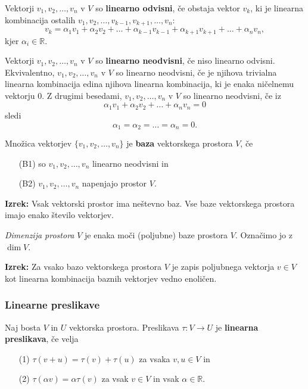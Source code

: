 \documentclass{article}
\begin{document}
\begin{multicols}{2}
Vektorji \( v_1, v_2, \ldots, v_n \) v \( V \) so \textbf{linearno odvisni}, če obstaja vektor \( v_k \), ki je linearna kombinacija ostalih \( v_1, v_2, \ldots, v_{k-1}, v_{k+1}, \ldots, v_n \):
\[ v_k = \alpha_1v_1 + \alpha_2v_2 + \ldots + \alpha_{k-1}v_{k-1} + \alpha_{k+1}v_{k+1} + \ldots + \alpha_nv_n, \]
kjer \( \alpha_i \in \mathbb{R} \).

Vektorji \( v_1, v_2, \ldots, v_n \) v \( V \) so \textbf{linearno neodvisni}, če niso linearno odvisni. Ekvivalentno, \( v_1, v_2, \ldots, v_n \) v \( V \) so linearno neodvisni, če je njihova trivialna linearna kombinacija edina njihova linearna kombinacija, ki je enaka ničelnemu vektorju \( 0 \). Z drugimi besedami, \( v_1, v_2, \ldots, v_n \) v \( V \) so linearno neodvisni, če iz
\[ \alpha_1v_1 + \alpha_2v_2 + \ldots + \alpha_nv_n = 0 \]
sledi
\[ \alpha_1 = \alpha_2 = \ldots = \alpha_n = 0. \]


Množica vektorjev \( \{v_1, v_2, \ldots, v_n\} \) je \textbf{baza} vektorskega prostora \( V \), če 
\begin{enumerate}
    \item[(B1)] so \( v_1, v_2, \ldots, v_n \) linearno neodvisni in
    \item[(B2)] \( v_1, v_2, \ldots, v_n \) napenjajo prostor \( V \).
\end{enumerate}

\textbf{Izrek:} Vsak vektorski prostor ima neštevno baz. Vse baze vektorskega prostora imajo enako število vektorjev.

\emph{Dimenzija prostora} \( V \) je enaka moči (poljubne) baze prostora \( V \). Označimo jo z \(\dim V\).

\textbf{Izrek:} Za vsako bazo vektorskega prostora \( V \) je zapis poljubnega vektorja \( v \in V \) kot linearna kombinacija baznih vektorjev vedno enoličen.


\subsubsection{Linearne preslikave}
Naj bosta \( V \) in \( U \) vektorska prostora. Preslikava \( \tau: V \to U \) je \textbf{linearna preslikava}, če velja
\begin{itemize}
    \item[(1)] \( \tau(v + u) = \tau(v) + \tau(u) \) za vsaka \( v, u \in V \) in
    \item[(2)] \( \tau(\alpha v) = \alpha \tau(v) \) za vsak \( v \in V \) in vsak \( \alpha \in \mathbb{R} \).
\end{itemize}


\end{multicols}
\end{document}
